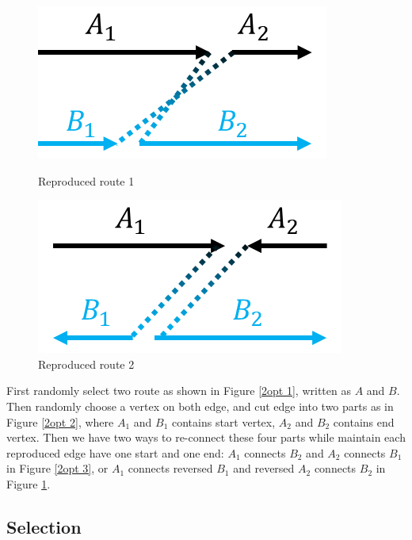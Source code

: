 \documentclass[journal]{IEEEtran}
\begin{document}
\begin{figure}[htbp]
		\begin{minipage}{0.49\linewidth}
			\centering
			\includegraphics[width=0.9\linewidth]{./picture/3.png}
			\caption{Reproduced route 1}
			\label{2opt 3}%
		\end{minipage}
		\begin{minipage}{0.49\linewidth}
			\centering
			\includegraphics[width=0.9\linewidth]{./picture/4.png}
			\caption{Reproduced route 2}
			\label{2opt 4}%
		\end{minipage}
	\end{figure}

	First randomly select two route as shown in Figure \ref{2opt 1}, written as $A$ and $B$. Then randomly choose a vertex on both edge, and cut edge into two parts as in Figure \ref{2opt 2}, where $A_1$ and $B_1$ contains start vertex, $A_2$ and $B_2$ contains end vertex. Then we have two ways to re-connect these four parts while maintain each reproduced edge have one start and one end: $A_1$ connects $B_2$ and $A_2$ connects $B_1$ in Figure \ref{2opt 3}, or $A_1$ connects reversed $B_1$ and reversed $A_2$ connects $B_2$ in Figure \ref{2opt 4}.

	\subsection{Selection}
	
\end{document}
